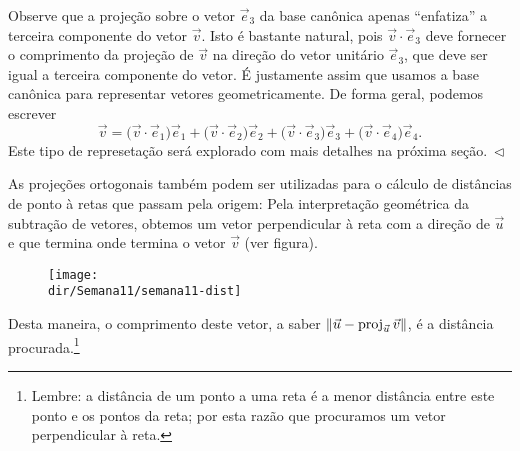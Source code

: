 \documentclass[../livro.tex]{subfiles}  %
\providecommand{\dir}{..}
\begin{document}
\begin{example}
\begin{equation}
	\end{equation} Observe que a projeção sobre o vetor $\vec{e}_3$ da base canônica apenas ``enfatiza'' a terceira componente do vetor $\vec{v}$. Isto é bastante natural, pois $\vec{v} \cdot \vec{e}_3$ deve fornecer o comprimento da projeção de $\vec{v}$ na direção do vetor unitário $\vec{e}_3$, que deve ser igual a terceira componente do vetor. É justamente assim que usamos a base canônica para representar vetores geometricamente. De forma geral, podemos escrever
	\begin{equation}
	\vec{v} = \big( \vec{v} \cdot \vec{e}_1 \big) \vec{e}_1 + \big( \vec{v} \cdot \vec{e}_2 \big) \vec{e}_2  + \big( \vec{v} \cdot \vec{e}_3 \big) \vec{e}_3  + \big( \vec{v} \cdot \vec{e}_4 \big) \vec{e}_4.
	\end{equation} Este tipo de represetação será explorado com mais detalhes na próxima seção$. \ \lhd$
\end{example}

As projeções ortogonais também podem ser utilizadas para o cálculo de distâncias de ponto à retas que passam pela origem: Pela interpretação geométrica da subtração de vetores, obtemos um vetor perpendicular à reta com a direção de $\vec{u}$ e que termina onde termina o vetor $\vec{v}$ (ver figura).
\begin{figure}[h!]
	\begin{center}
		\texttt{[image: \\dir/Semana11/semana11-dist]}
	\end{center}
\end{figure}

\noindent Desta maneira, o comprimento deste vetor, a saber $\|\vec{u} - \operatorname{proj}_{\vec{u}} \vec{v}\|$, é a distância procurada.\footnote{Lembre: a distância de um ponto a uma reta é a menor distância entre este ponto e os pontos da reta; por esta razão que procuramos um vetor perpendicular à reta.}
\end{document}
